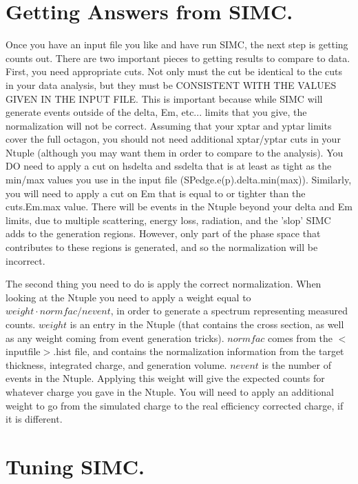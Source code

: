 \section{Getting Answers from SIMC.}

Once you have an input file you like and have run SIMC, the next step is
getting counts out.  There are two important pieces to getting results
to compare to data.  First, you need appropriate cuts.  Not only must the
cut be identical to the cuts in your data analysis, but they must be
CONSISTENT WITH THE VALUES GIVEN IN THE INPUT FILE.  This is important
because while SIMC will generate events outside of the delta, Em, etc...
limits that you give, the normalization will not be correct.  Assuming
that your xptar and yptar limits cover the full octagon, you should not
need additional xptar/yptar cuts in your Ntuple (although you may want
them in order to compare to the analysis).  You DO need to apply a cut
on hsdelta and ssdelta that is at least as tight as the min/max values
you use in the input file (SPedge.e(p).delta.min(max)).  Similarly, you
will need to apply a cut on Em that is equal to or tighter than the
cuts.Em.max value.  There will be events in the Ntuple beyond your delta
and Em limits, due to multiple scattering, energy loss, radiation, and the
'slop' SIMC adds to the generation regions.  However, only part of the phase
space that contributes to these regions is generated, and so the normalization
will be incorrect.

The second thing you need to do is apply the correct normalization.
When looking at the Ntuple you need to apply a weight equal to $weight \cdot
normfac / nevent$, in order to generate a spectrum representing measured
counts.  $weight$ is an entry in the Ntuple (that contains the cross section,
as well as any weight coming from event generation tricks).  $normfac$
comes from the $<$inputfile$>$.hist file, and contains the normalization 
information from the target thickness, integrated charge, and generation
volume.  $nevent$ is the number of events in the Ntuple.  Applying this
weight will give the expected counts for whatever charge you gave in
the Ntuple.  You will need to apply an additional weight to go from
the simulated charge to the real efficiency corrected charge, if it
is different.



\section{Tuning SIMC.}

